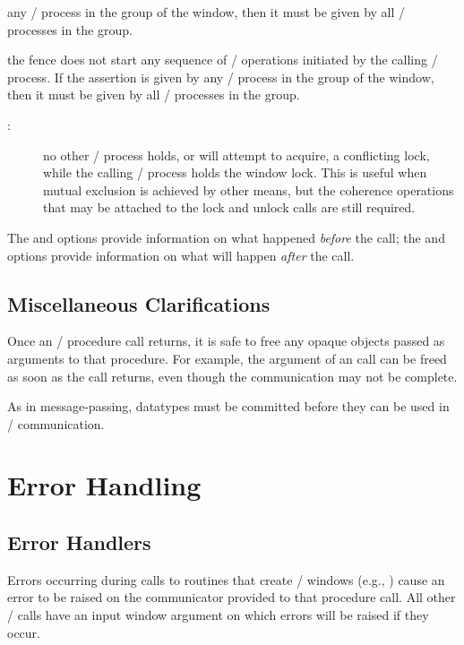 \begin{description}
\begin{description}
any \mpi/ process in the group of the window, then it must be given by all
\mpi/ processes in the group. 
\item[\mpiconst{MPI\_MODE\_NOSUCCEED}:]the
fence does not start any sequence
of \RMA/ operations initiated by the calling \mpi/ process.  If the assertion is given by any \mpi/ process
in the group of the window, then it must be given by all \mpi/ processes in the group.
\end{description}
\item[\mpifunc{MPI\_WIN\_LOCK}, \mpifunc{MPI\_WIN\_LOCK\_ALL}:]\quad
\begin{description}
\item[:]no
other \mpi/ process holds, or will attempt
to acquire, a
conflicting lock, while the calling \MPI/ process holds the window lock.   This is useful
when
mutual exclusion is achieved by other means, but the coherence operations
that
may be attached to the lock and unlock calls are still required.
\end{description}
\end{description}

\begin{users}
The  and  options provide
information on what happened \emph{before}
the call; the  and 
options provide information on what will happen \emph{after} the call.
\end{users}

\subsection{Miscellaneous Clarifications}
Once an \RMA/ procedure call returns, it is safe to free any opaque
objects passed as arguments to that procedure.
For example, the 
 argument of an  call can be freed
as soon as the call returns, even though the communication may not be
complete. 

As in message-passing, datatypes must be committed before they can
be used in \RMA/ communication.

\section{Error Handling}
\label{sec:1sided-errhandlers}

\subsection{Error Handlers}
Errors occurring
during calls to
routines that
create \MPI/ windows (e.g.,
) cause an
error to be raised on the communicator provided to that procedure call.
All other \RMA/ calls have an input window argument on which errors will be raised if they occur.


